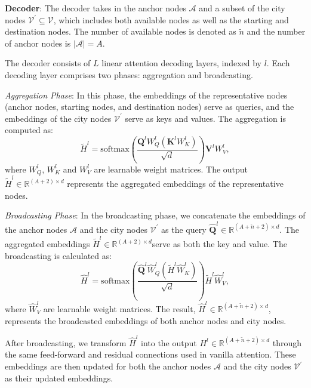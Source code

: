 \textbf{Decoder}: 
The decoder takes in the anchor nodes $\mathcal{A}$ and a subset of the city nodes $\mathcal{V}^{\prime} \subseteq \mathcal{V}$, which includes both available nodes as well as the starting and destination nodes. 
The number of available nodes is denoted as $\tilde{n}$ and the number of anchor nodes is $|\mathcal{A}|=A$. 

The decoder consists of $L$ linear attention decoding layers, indexed by $l$. 
Each decoding layer comprises two phases: aggregation and broadcasting.

\textit{Aggregation Phase}: In this phase, the embeddings of the representative nodes (anchor nodes, starting nodes, and destination nodes) serve as queries, and the embeddings of the city nodes $\mathcal{V}^{\prime}$ serve as keys and values. The aggregation is computed as: 
\begin{equation}
{\tilde{H}^{l}=\text{softmax}\left(\frac{\mathbf{Q}_{}^{l} W_{Q}^{l}(\mathbf{K}_{}^{l} W_{K}^{l})}{\sqrt{d}}\right)\mathbf{V}^{l}W_{V}^{l}},
\label{eq:Aggregation}
\end{equation}
where $W_{Q}^{l}$, $W_{K}^{l}$ and $W_{V}^{l}$ are learnable  weight matrices. The output $\tilde{H}^{l} \in \mathbb{R}^{(A+2) \times d}$ represents the aggregated embeddings of the representative nodes. 

\textit{Broadcasting Phase}: In the broadcasting phase, we concatenate the embeddings of the anchor nodes $\mathcal{A}$ and the city nodes $\mathcal{V}^{\prime}$ as the query $\hat{\mathbf{Q}}_{}^{l} \in \mathbb{R}^{(A+\tilde{n}+2) \times d}$. 
The aggregated embeddings $\tilde{H}^{l} \in \mathbb{R}^{(A+2) \times d}$serve as both the key and value. The broadcasting is calculated as: 
\begin{equation}
{\hat{H}^{l} = \text{softmax}\left(\frac{\hat{\mathbf{Q}}_{}^{l} \hat{W}_{Q}^{l}(\tilde{H}^{l} \hat{W}_{K}^{l})}{\sqrt{d}}\right)\tilde{H}^{l}\hat{W}_{V}^{l}},
\label{eq:Broadcasting}
\end{equation}
where $\hat{W}_{V}^{l}$ are learnable weight matrices. 
The result, $\hat{H}^{l} \in \mathbb{R}^{(A+\tilde{n}+2) \times d}$,  represents the broadcasted embeddings of both anchor nodes and city nodes.  

After broadcasting, we transform $\hat{H}^{l}$ into the output $H^{l} \in \mathbb{R}^{(A+\tilde{n}+2) \times d}$ through the same feed-forward and residual connections used in vanilla attention. These embeddings are then updated for both the anchor nodes $\mathcal{A}$ and the city nodes $\mathcal{V}^{\prime}$ as their updated embeddings. 

